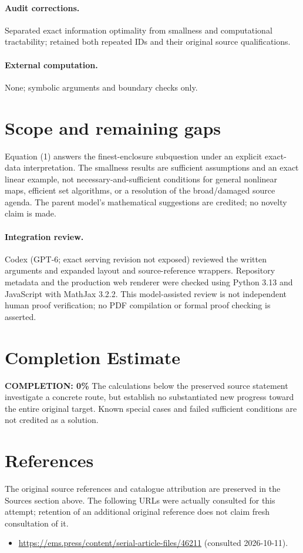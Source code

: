\documentclass[11pt]{article}
\begin{document}
\paragraph{Audit corrections.} Separated exact information optimality from smallness and computational tractability; retained both repeated IDs and their original source qualifications.
\paragraph{External computation.} None; symbolic arguments and boundary checks only.
\section{Scope and remaining gaps}
Equation (1) answers the finest-enclosure subquestion under an explicit exact-data interpretation. The smallness results are sufficient assumptions and an exact linear example, not necessary-and-sufficient conditions for general nonlinear maps, efficient set algorithms, or a resolution of the broad/damaged source agenda. The parent model's mathematical suggestions are credited; no novelty claim is made.
\paragraph{Integration review.} Codex (GPT-6; exact serving revision not exposed) reviewed the written arguments and expanded layout and source-reference wrappers. Repository metadata and the production web renderer were checked using Python 3.13 and JavaScript with MathJax 3.2.2. This model-assisted review is not independent human proof verification; no PDF compilation or formal proof checking is asserted.

\section{Completion Estimate}
\noindent\textbf{COMPLETION: 0\%}
The calculations below the preserved source statement investigate a concrete route,
but establish no substantiated new progress toward the entire original target.
Known special cases and failed sufficient conditions are not credited as a solution.
\section{References}
The original source references and catalogue attribution are preserved in the
Sources section above. The following URLs were actually consulted for this attempt;
retention of an additional original reference does not claim fresh consultation of it.
\begin{itemize}
\item \url{https://ems.press/content/serial-article-files/46211} (consulted 2026-10-11). 
\end{itemize}
\end{document}
